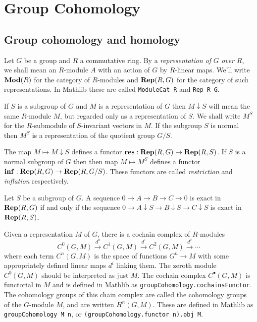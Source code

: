\chapter{Group Cohomology}

\section{Group cohomology and homology}

Let $G$ be a group and $R$ a commutative ring.
By a \emph{representation of $G$ over $R$},
we shall mean an $R$-module $A$ with an action of $G$ by $R$-linear maps.
We'll write $\mathbf{Mod}(R)$ for the category of $R$-modules and $\mathbf{Rep}(R,G)$
for the category of such representations.
In Mathlib these are called \texttt{ModuleCat R} and \texttt{Rep R G}.

If $S$ is a subgroup of $G$ and $M$ is a representation of $G$
then $M \downarrow S$ will mean the same $R$-module $M$,
but regarded only as a representation of $S$.
We shall write $M^S$ for the $R$-submodule of $S$-invariant vectors in $M$.
If the subgroup $S$ is normal then $M^S$ is a representation of the quotient group $G/S$.

\begin{definition} \label{def:inflation restriction functors}
	The map $M \mapsto M \downarrow S$ defines a functor $\mathbf{res} : \mathbf{Rep}(R,G) \to \mathbf{Rep}(R,S)$.
	If $S$ is a normal subgroup of $G$ then then map $M \mapsto M^S$ defines
	a functor $\mathbf{inf} : \mathbf{Rep}(R,G) \to \mathbf{Rep}(R, G/S)$.
	These functors are called \emph{restriction} and \emph{inflation} respectively.
\end{definition}

\begin{lemma} \label{lem:restriction exact}
	Let $S$ be a subgroup of $G$.
	A sequence $0 \to A \to B \to C \to 0$ is exact in $\mathbf{Rep}(R,G)$ if and only if
	the sequence $0 \to A \downarrow S \to B \downarrow S \to C \downarrow S$ is exact
	in $\mathbf{Rep}(R,S)$.
\end{lemma}

Given a representation $M$ of $G$, there is a cochain complex of $R$-modules
\[
	C^0(G,M) \stackrel{d^0}\to C^1(G,M)  \stackrel{d^1}\to C^2(G,M)  \stackrel{d^2}\to \cdots
\]
where each term $C^n(G,M)$ is the space of functions $G^n \to M$ with some appropriately defined
linear maps $d^i$ linking them.
The zeroth module $C^0(G,M)$ should be interpreted as just $M$.
The cochain complex $C^\bullet(G,M)$ is functorial in $M$ and is defined in Mathlib as
\texttt{groupCohomology.cochainsFunctor}.
The cohomology groups of this chain complex are called the cohomology groups of the
$G$-module $M$, and are written $H^n(G,M)$. These are defined in Mathlib as
\texttt{groupCohomology M n}, or \texttt{(groupCohomology.functor n).obj M}.

